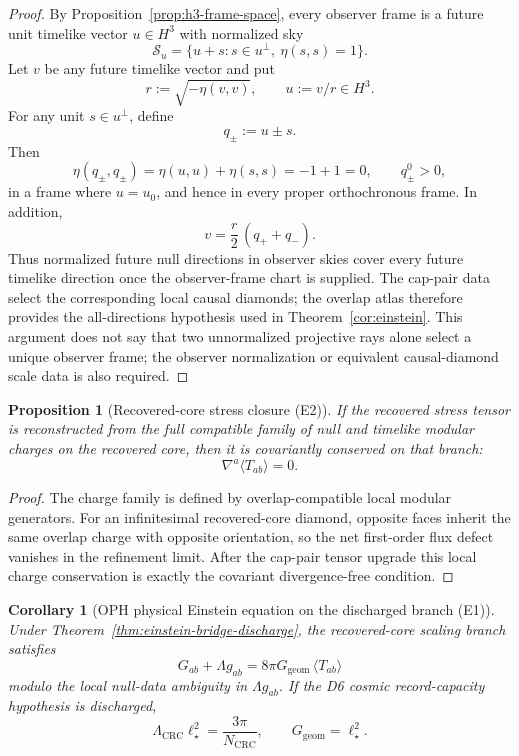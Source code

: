 \documentclass[11pt]{article}
\newtheorem{corollary}[theorem]{Corollary}
\newtheorem{proposition}[theorem]{Proposition}
\begin{document}
\begin{proof}
By Proposition~\ref{prop:h3-frame-space}, every observer frame is a future
unit timelike vector \(u\in H^3\) with normalized sky
\[
\mathcal S_u=\{u+s:s\in u^\perp,\ \eta(s,s)=1\}.
\]
Let \(v\) be any future timelike vector and put
\[
r:=\sqrt{-\eta(v,v)},\qquad u:=v/r\in H^3.
\]
For any unit \(s\in u^\perp\), define
\[
q_\pm:=u\pm s.
\]
Then
\[
\eta(q_\pm,q_\pm)=\eta(u,u)+\eta(s,s)=-1+1=0,
\qquad
q_\pm^0>0,
\]
in a frame where \(u=u_0\), and hence in every proper orthochronous frame.
In addition,
\[
\boxed{
v=\frac r2\,(q_++q_-).
}
\]
Thus normalized future null directions in observer skies cover every future
timelike direction once the observer-frame chart is supplied. The cap-pair
data select the corresponding local causal diamonds; the overlap atlas
therefore provides the all-directions hypothesis used in
Theorem~\ref{cor:einstein}. This argument does not say that two unnormalized
projective rays alone select a unique observer frame; the observer
normalization or equivalent causal-diamond scale data is also required.
\end{proof}

\begin{proposition}[Recovered-core stress closure (E2)]\label{prop:recovered-core-stress-closure}
If the recovered stress tensor is reconstructed from the full compatible
family of null and timelike modular charges on the recovered core, then it is
covariantly conserved on that branch:
\[
\nabla^a\langle T_{ab}\rangle=0 .
\]
\end{proposition}

\begin{proof}
The charge family is defined by overlap-compatible local modular generators.
For an infinitesimal recovered-core diamond, opposite faces inherit the same
overlap charge with opposite orientation, so the net first-order flux defect
vanishes in the refinement limit.  After the cap-pair tensor upgrade this
local charge conservation is exactly the covariant divergence-free condition.
\end{proof}

\begin{corollary}[OPH physical Einstein equation on the discharged branch (E1)]\label{cor:oph-physical-einstein-equation}
Under Theorem~\ref{thm:einstein-bridge-discharge}, the recovered-core scaling
branch satisfies
\[
G_{ab}+\Lambda g_{ab}=8\pi G_{\mathrm{geom}}\,
\langle T_{ab}\rangle
\]
modulo the local null-data ambiguity in \(\Lambda g_{ab}\). If the D6 cosmic
record-capacity hypothesis is discharged,
\[
\Lambda_{\mathrm{CRC}}\ell_\star^2=\frac{3\pi}{N_{\mathrm{CRC}}},
\qquad
G_{\mathrm{geom}}=\ell_\star^2 .
\]
\end{corollary}
\end{document}

